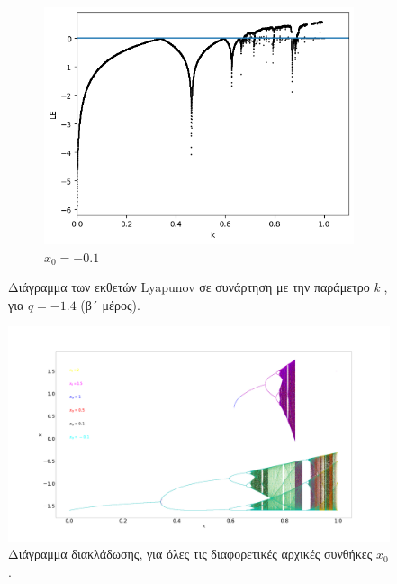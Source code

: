 \begin{figure}[ht]
\begin{subfigure}[b]{0.7\textwidth}
		\centering
		\includegraphics[width=\textwidth]{LateX images/graphs q16/g12}
		\caption{\(x_0=-0.1\)}
		\label{f:g38}
	\end{subfigure}
	\hfill
	\caption{ Διάγραμμα των εκθετών Lyapunov σε συνάρτηση με την παράμετρο \emph{k} , για  $q=-1.4$ (β´ μέρος).}
\end{figure}


\begin{figure}[ht]
	\centering
	\includegraphics[width=1\linewidth]{LateX images/graphs q16/g30}
	\caption{Διάγραμμα διακλάδωσης, για όλες τις διαφορετικές αρχικές συνθήκες $x_0$.}
	\label{f:g232}
\end{figure}

